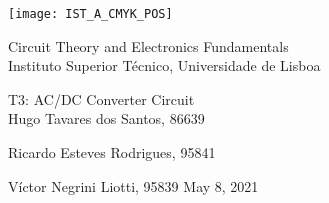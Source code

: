 
\thispagestyle {empty}

\texttt{[image: IST\_A\_CMYK\_POS]}

\begin{center}
%
\vspace{1.0cm}

\vspace{1cm}
{\FontLb Circuit Theory and Electronics Fundamentals} \\ %
\vspace{1cm}
{\FontSn Instituto Superior Técnico, Universidade de Lisboa} \\ %
\vspace{1cm}

{\FontSn T3: AC/DC Converter Circuit} \\
\vspace{1cm}
{\FontSn Hugo Tavares dos Santos, 86639}
\par{\FontSn Ricardo Esteves Rodrigues, 95841}
\par{\FontSn Víctor Negrini Liotti, 95839}
\vspace{1.0cm}
{\FontSn May 8, 2021} \\ %
%
\end{center}

